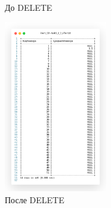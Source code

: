\begin{figure}[!h]
\begin{minipage}{0.24\textwidth}
    \caption{До DELETE}
    \label{fig:task5_2_3_before}
  \end{minipage}
  \begin{minipage}{0.24\textwidth}
    \centering

    \includegraphics[width=4.5cm]
    {../sql/task5/task5_2_3_after.png}

    \caption{После DELETE}
    \label{fig:task5_2_3_after}
  \end{minipage}
\end{figure}

